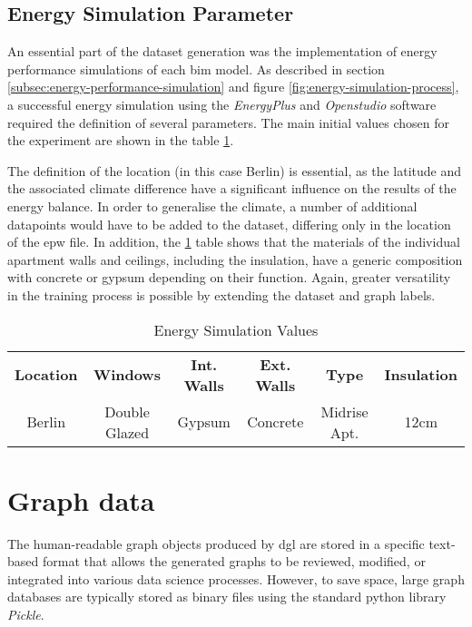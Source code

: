 \documentclass[a4paper, 12pt]{report}
\begin{document}
\subsection{Energy Simulation Parameter}\label{subsec:energy-simulation-parameter}

An essential part of the dataset generation was the implementation of energy performance simulations of each \acrshort{bim} model. As described in section \ref{subsec:energy-performance-simulation} and figure \ref{fig:energy-simulation-process}, a successful energy simulation using the \textit{EnergyPlus} and \textit{Openstudio} software required the definition of several parameters. The main initial values chosen for the experiment are shown in the table \ref{tab:energy-simulation-values}.

The definition of the location (in this case Berlin) is essential, as the latitude and the associated climate difference have a significant influence on the results of the energy balance. In order to generalise the climate, a number of additional datapoints would have to be added to the dataset, differing only in the location of the \acrfull{epw} file. In addition, the \ref{tab:energy-simulation-values} table shows that the materials of the individual apartment walls and ceilings, including the insulation, have a generic composition with concrete or gypsum depending on their function. Again, greater versatility in the training process is possible by extending the dataset and graph labels.

\begin{table}
\centering
\begin{tabular}{ cccccc }
\textbf{Location} & \textbf{Windows} & \textbf{Int. Walls} & \textbf{Ext. Walls} & \textbf{Type} & \textbf{Insulation} \\
Berlin & Double Glazed & Gypsum & Concrete & Midrise Apt. & 12cm \\
\end{tabular}
\caption{Energy Simulation Values}
\label{tab:energy-simulation-values}
\end{table}

\section{Graph data}\label{sec:graph-data}

The human-readable graph objects produced by \acrshort{dgl} are stored in a specific text-based format that allows the generated graphs to be reviewed, modified, or integrated into various data science processes. However, to save space, large graph databases are typically stored as binary files using the standard \Gls{python} library \textit{Pickle}.
\end{document}
